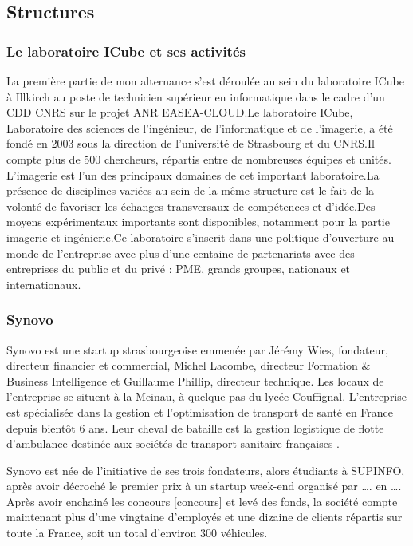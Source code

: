 \documentclass[french, 11pt]{memoir}
\begin{document}
\subsection{Structures}\label{structures}

\subsubsection{Le laboratoire ICube et ses
	activités}\label{le-laboratoire-icube-et-ses-activituxe9s}

La première partie de mon alternance s'est déroulée au sein du
laboratoire ICube à Illkirch au poste de technicien supérieur en
informatique dans le cadre d'un CDD CNRS sur le projet ANR
EASEA-CLOUD.Le laboratoire ICube, Laboratoire des sciences de
l'ingénieur, de l'informatique et de l'imagerie, a été fondé en 2003
sous la direction de l'université de Strasbourg et du CNRS.Il compte
plus de 500 chercheurs, répartis entre de nombreuses équipes et unités.
L'imagerie est l'un des principaux domaines de cet important
laboratoire.La présence de disciplines variées au sein de la même
structure est le fait de la volonté de favoriser les échanges
transversaux de compétences et d'idée.Des moyens expérimentaux
importants sont disponibles, notamment pour la partie imagerie et
ingénierie.Ce laboratoire s'inscrit dans une politique d'ouverture au
monde de l'entreprise avec plus d'une centaine de partenariats avec des
entreprises du public et du privé : PME, grands groupes, nationaux et
internationaux.

\subsubsection{Synovo}\label{synovo}

Synovo est une startup strasbourgeoise emmenée par Jérémy Wies,
fondateur, directeur financier et commercial, Michel Lacombe, directeur
Formation \& Business Intelligence et Guillaume Phillip, directeur
technique. Les locaux de l'entreprise se situent à la Meinau, à quelque
pas du lycée Couffignal.
L'entreprise est spécialisée dans la gestion et l'optimisation de
transport de santé en France depuis bientôt 6 ans. Leur cheval de
bataille est la gestion logistique de flotte d'ambulance destinée aux
sociétés de transport sanitaire françaises .

Synovo est née de l'initiative de ses trois fondateurs, alors étudiants
à SUPINFO, après avoir décroché le premier prix à un startup week-end
organisé par \ldots{}. en \ldots{}. Après avoir enchainé les concours
{[}concours{]} et levé des fonds, la société compte maintenant plus
d'une vingtaine d'employés et une dizaine de clients répartis sur toute
la France, soit un total d'environ 300 véhicules.
\end{document}
